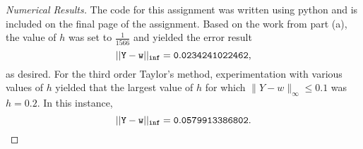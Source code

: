 \documentclass[8pt]{article}
\theoremstyle{definition}
\begin{document}
\begin{proof}[Numerical Results]
The code for this assignment was written using python and is included on the final page of the assignment. Based on the work from part (a), the value of $h$ was set to $\frac{1}{1566}$ and yielded the error result $$\tt{|| Y - w ||_{inf} =  0.0234241022462},$$ as desired. For the third order Taylor's method, experimentation with various values of $h$ yielded that the largest value of $h$ for which $\| Y - w \|_{\infty} \leq 0.1$ was $h = 0.2$. In this instance, 
$$\tt{|| Y - w ||_{inf} =  0.0579913386802}.$$
\end{proof}
\end{document}
